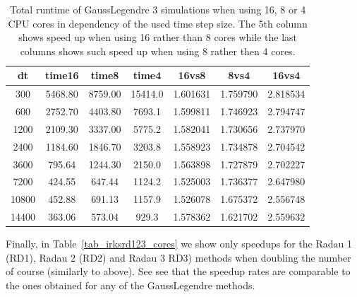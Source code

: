 \documentclass[a4paper, 12pt]{article}
\begin{document}
\begin{table}[h]\centering
\begin{tabular}{c|c|c|c|c|c|c }
dt &  time16  &  time8  & time4  &   16vs8   &   8vs4                 & 16vs4 \\\hline
    300  &  5468.80  &  8759.00  &  15414.0  &  1.601631  &  1.759790  &  2.818534\\
    600  &  2752.70  &  4403.80   &  7693.1  &  1.599811  &  1.746923  & 2.794747 \\
   1200  &  2109.30  &  3337.00   &  5775.2  &  1.582041  &  1.730656  & 2.737970 \\
   2400  &  1184.60  &  1846.70   &  3203.8  &  1.558923  &  1.734878  &  2.704542\\
   3600  &   795.64  &  1244.30   &  2150.0  &  1.563898  &  1.727879  &  2.702227\\
   7200   &  424.55   &  647.44   &  1124.2  &  1.525003  &  1.736377  &  2.647980\\
  10800   &  452.88   &  691.13   &  1157.9  &  1.526078  &  1.675372  &  2.556748\\
  14400   &  363.06   &  573.04    &  929.3   & 1.578362   & 1.621702  &  2.559632
\end{tabular}
\caption{Total runtime of GaussLegendre 3 simulations when using 16, 8 or 4 CPU cores in dependency of the used time step size. The 5th column shows speed up when using 16 rather than 8 cores while the last columns shows such speed up when using 8 rather then 4 cores.}
\label{tab_irksgl3_cores}
\end{table}



Finally, in Table~\ref{tab_irksrd123_cores} we show only speedups for the Radau 1 (RD1),
Radau 2 (RD2) and Radau 3 RD3) methods when doubling the number of course (similarly to above).
See see that the speedup rates are comparable to the ones obtained for any of the GaussLegendre methods.
\end{document}
